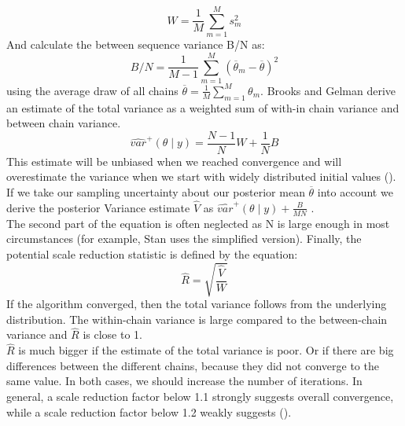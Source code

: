 $$W=\frac{1}{M} \sum_{m=1}^{M} s_m^2 $$
And calculate the between sequence variance B/N as:
$$B/N=\frac{1}{M-1} \sum_{m=1}^{M} (\overline{\theta}_m-\overline{\theta} )^2 $$
using the average draw of all chains $\overline{\theta}=\frac{1}{M} \sum_{m=1}^{M} \theta_m$.
Brooks and Gelman derive an estimate of the total variance as a weighted sum of with-in chain variance and between chain variance.
$$\widehat{var}^+ (\theta \mid y)=\frac{N-1}{N}W+\frac{1}{N}B$$
This estimate will be unbiased when we reached convergence and will overestimate the variance when we start with widely distributed initial values (\cite{brooks1998}).
If we take our sampling uncertainty about our posterior mean $\overline{\theta} $ into account we derive the posterior Variance estimate $\widehat{V}$ as $\widehat{var}^+ (\theta \mid y) +\frac{B}{MN}$
.\\
The second part of the equation is often neglected as N is large enough in most circumstances (for example, Stan uses the simplified version).
Finally, the potential scale reduction statistic is defined by the equation:
$$\widehat{R}=\sqrt{\frac{\widehat{V}}{W}}$$
If the algorithm converged, then the total variance follows from the underlying distribution. The within-chain variance is large compared to the between-chain variance and $ \widehat{R}$ is close to 1.\\
$\widehat{R}$ is much bigger if the estimate of the total variance is poor. Or if there are big differences between the different chains, because they did not converge to the same value. In both cases, we should increase the number of iterations. In general, a scale reduction factor below 1.1 strongly suggests overall convergence, while a scale reduction factor below 1.2 weakly suggests (\cite{brooks1998}).


